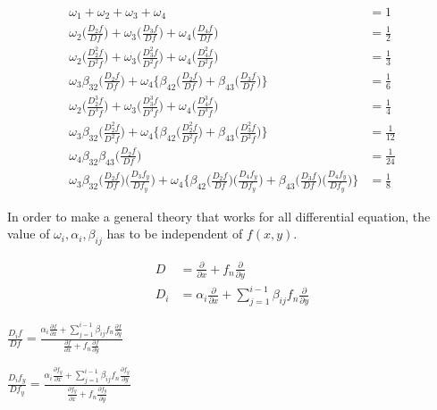 \documentclass[12 pt]{article}
\begin{document}
\begin{align*}
	\omega_{1} + \omega_{2} + \omega_{3} + \omega_{4} &= 1\\
	\omega_{2}\bigg(\frac{D_{2}f}{Df}\bigg) + \omega_{3}\bigg(\frac{D_{3}f}{Df}\bigg) + \omega_{4}\bigg(\frac{D_{4}f}{Df}\bigg) &= \frac{1}{2}\\
	\omega_{2}\bigg(\frac{D_{2}^{2}f}{D^{2}f}\bigg) + \omega_{3}\bigg(\frac{D_{3}^{2}f}{D^{2}f}\bigg) + \omega_{4}\bigg(\frac{D_{4}^{2}f}{D^{2}f}\bigg) &= \frac{1}{3}\\
	\omega_{3}\beta_{32}\bigg(\frac{D_{2}f}{Df}\bigg) + \omega_{4}\bigg\{\beta_{42}\bigg(\frac{D_{2}f}{Df}\bigg) + 
	\beta_{43}\bigg(\frac{D_{3}f}{Df}\bigg)\bigg\} &= \frac{1}{6}\\
	\omega_{2}\bigg(\frac{D_{2}^{3}f}{D^{3}f}\bigg) + 
	\omega_{3}\bigg(\frac{D_{3}^{3}f}{D^{3}f}\bigg) + 
	\omega_{4}\bigg(\frac{D_{4}^{3}f}{D^{3}f}\bigg) &= \frac{1}{4}\\
	\omega_{3}\beta_{32}\bigg(\frac{D_{2}^{2}f}{D^{2}f}\bigg) + \omega_{4}\bigg\{\beta_{42}\bigg(\frac{D_{2}^{2}f}{D^{2}f}\bigg) +
	\beta_{43}\bigg(\frac{D_{3}^{2}f}{D^{2}f}\bigg)\bigg\} &= \frac{1}{12}\\
	\omega_{4}\beta_{32}\beta_{43}\bigg(\frac{D_{2}f}{Df}\bigg) &= \frac{1}{24}\\
	\omega_{3}\beta_{32}\bigg(\frac{D_{2}f}{Df}\bigg)\bigg(\frac{D_{3}f_{y}}{Df_{y}}\bigg) + 
	\omega_{4}\bigg\{\beta_{42}\bigg(\frac{D_{2}f}{Df}\bigg)\bigg(\frac{D_{4}f_{y}}{Df_{y}}\bigg) + 
	\beta_{43}\bigg(\frac{D_{3}f}{Df}\bigg)\bigg(\frac{D_{4}f_{y}}{Df_{y}}\bigg)\bigg\} &= \frac{1}{8}
\end{align*}

In order to make a general theory that works for all differential equation, the value of $\omega_{i}, \alpha_{i}, \beta_{ij}$ has to be independent of $f(x,y)$.

\begin{align*}
	D &= \frac{\partial}{\partial x} + f_{n}\frac{\partial}{\partial y}\\
	D_{i}&= \alpha_{i}\frac{\partial }{\partial x} + \sum_{j=1}^{i-1}\beta_{ij}f_{n}\frac{\partial }{\partial y}
\end{align*}

$\frac{D_{i}f}{Df} = \frac{\alpha_{i}\frac{\partial f}{\partial x} + \sum_{j=1}^{i-1}\beta_{ij}f_{n}\frac{\partial f}{\partial y}}{\frac{\partial f}{\partial x} + f_{n}\frac{\partial f}{\partial y}}$

$\frac{D_{i}f_{y}}{Df_{y}} = \frac{\alpha_{i}\frac{\partial f_{y}}{\partial x} + \sum_{j=1}^{i-1}\beta_{ij}f_{n}\frac{\partial f_{y}}{\partial y}}{\frac{\partial f_{y}}{\partial x} + f_{n}\frac{\partial f_{y}}{\partial y}}$
\end{document}
